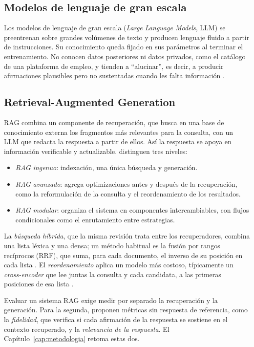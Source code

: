 \subsection{Modelos de lenguaje de gran escala}

Los modelos de lenguaje de gran escala (\textit{Large Language Models}, LLM) se preentrenan sobre grandes volúmenes de texto y producen lenguaje fluido a partir de instrucciones. Su conocimiento queda fijado en sus parámetros al terminar el entrenamiento. No conocen datos posteriores ni datos privados, como el catálogo de una plataforma de empleo, y tienden a \enquote{alucinar}, es decir, a producir afirmaciones plausibles pero no sustentadas cuando les falta información \citep{Gao2023}.

\subsection{Retrieval-Augmented Generation}

RAG \citep{Lewis2020} combina un componente de recuperación, que busca en una base de conocimiento externa los fragmentos más relevantes para la consulta, con un LLM que redacta la respuesta a partir de ellos. Así la respuesta se apoya en información verificable y actualizable. \citet{Gao2023} distinguen tres niveles:
\begin{itemize}
    \item \emph{RAG ingenuo}: indexación, una única búsqueda y generación.
    \item \emph{RAG avanzado}: agrega optimizaciones antes y después de la recuperación, como la reformulación de la consulta y el reordenamiento de los resultados.
    \item \emph{RAG modular}: organiza el sistema en componentes intercambiables, con flujos condicionales como el enrutamiento entre estrategias.
\end{itemize}
La \emph{búsqueda híbrida}, que la misma revisión trata entre los recuperadores, combina una lista léxica y una densa; un método habitual es la fusión por rangos recíprocos (RRF), que suma, para cada documento, el inverso de su posición en cada lista \citep{Cormack2009}. El \emph{reordenamiento} aplica un modelo más costoso, típicamente un \textit{cross-encoder} que lee juntas la consulta y cada candidata, a las primeras posiciones de esa lista \citep{Nogueira2019}.

Evaluar un sistema RAG exige medir por separado la recuperación y la generación. Para la segunda, \citet{Es2024} proponen métricas sin respuesta de referencia, como la \emph{fidelidad}, que verifica si cada afirmación de la respuesta se sostiene en el contexto recuperado, y la \emph{relevancia de la respuesta}. El Capítulo~\ref{cap:metodologia} retoma estas dos.

